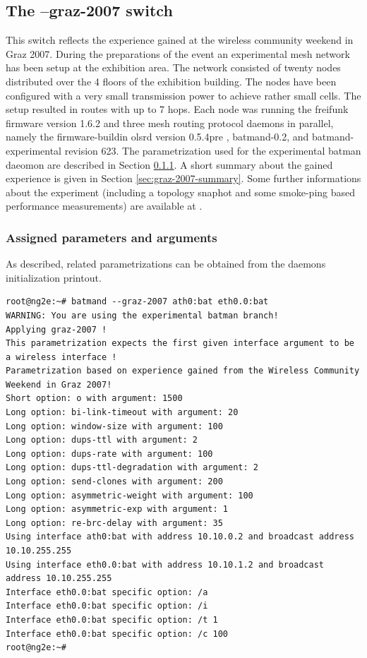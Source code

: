 \documentclass[11pt]{article}
\begin{document}
\subsection{The --graz-2007 switch}
\label{sec:graz-2007}

This switch reflects the experience gained at the wireless community weekend in Graz 2007.
During the preparations of the event an experimental mesh network has been setup at the exhibition area.
The network consisted of twenty nodes distributed over the 4 floors of the exhibition building. 
The nodes have been configured with a very small transmission power to achieve rather small cells. 
The setup resulted in routes with up to 7 hops.
Each node was running the freifunk firmware \cite{freifunk-firmware} version 1.6.2 and three mesh routing protocol daemons in parallel, namely the firmware-buildin olsrd version 0.5.4pre \cite{olsr-org}, batmand-0.2, and batmand-experimental revision 623. 
The parametrization used for the experimental batman daeomon are described in Section \ref{sec:graz-2007-parameters}.
A short summary about the gained experience is given in Section \ref{sec:graz-2007-summary}.
%
Some further informations about the experiment (including a topology snaphot and some smoke-ping based performance measurements) are available at \cite{graz-experience}.


\subsubsection{Assigned parameters and arguments}
\label{sec:graz-2007-parameters}

As described, related parametrizations can be obtained from the daemons initialization printout. 


\begin{small} \begin{verbatim}
root@ng2e:~# batmand --graz-2007 ath0:bat eth0.0:bat
WARNING: You are using the experimental batman branch!
Applying graz-2007 !
This parametrization expects the first given interface argument to be a wireless interface !
Parametrization based on experience gained from the Wireless Community Weekend in Graz 2007!
Short option: o with argument: 1500
Long option: bi-link-timeout with argument: 20
Long option: window-size with argument: 100
Long option: dups-ttl with argument: 2
Long option: dups-rate with argument: 100
Long option: dups-ttl-degradation with argument: 2
Long option: send-clones with argument: 200
Long option: asymmetric-weight with argument: 100
Long option: asymmetric-exp with argument: 1
Long option: re-brc-delay with argument: 35
Using interface ath0:bat with address 10.10.0.2 and broadcast address 10.10.255.255
Using interface eth0.0:bat with address 10.10.1.2 and broadcast address 10.10.255.255
Interface eth0.0:bat specific option: /a
Interface eth0.0:bat specific option: /i
Interface eth0.0:bat specific option: /t 1
Interface eth0.0:bat specific option: /c 100
root@ng2e:~#
\end{verbatim} \end{small}
\end{document}
